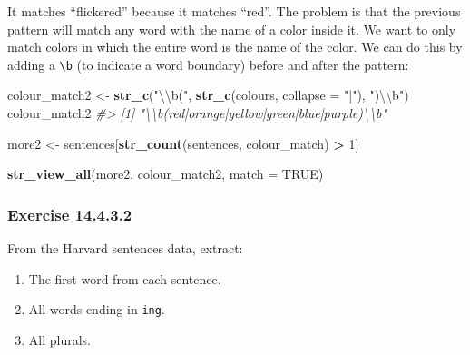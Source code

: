 \documentclass[]{book}
\newenvironment{Shaded}{\begin{snugshade}}{\end{snugshade}}
\newcommand{\CharTok}[1]{\textcolor[rgb]{0.31,0.60,0.02}{#1}}
\newcommand{\CommentTok}[1]{\textcolor[rgb]{0.56,0.35,0.01}{\textit{#1}}}
\newcommand{\DataTypeTok}[1]{\textcolor[rgb]{0.13,0.29,0.53}{#1}}
\newcommand{\DecValTok}[1]{\textcolor[rgb]{0.00,0.00,0.81}{#1}}
\newcommand{\KeywordTok}[1]{\textcolor[rgb]{0.13,0.29,0.53}{\textbf{#1}}}
\newcommand{\NormalTok}[1]{#1}
\newcommand{\OperatorTok}[1]{\textcolor[rgb]{0.81,0.36,0.00}{\textbf{#1}}}
\newcommand{\OtherTok}[1]{\textcolor[rgb]{0.56,0.35,0.01}{#1}}
\newcommand{\StringTok}[1]{\textcolor[rgb]{0.31,0.60,0.02}{#1}}
\providecommand{\tightlist}{%
  \setlength{\itemsep}{0pt}\setlength{\parskip}{0pt}}
\theoremstyle{plain}
\theoremstyle{remark}
\begin{document}
It matches ``flickered'' because it matches ``red''. The problem is that
the previous pattern will match any word with the name of a color inside
it. We want to only match colors in which the entire word is the name of
the color. We can do this by adding a \texttt{\textbackslash{}b} (to
indicate a word boundary) before and after the pattern:

\begin{Shaded}
\begin{Highlighting}[]
\NormalTok{colour_match2 <-}\StringTok{ }\KeywordTok{str_c}\NormalTok{(}\StringTok{"}\CharTok{\textbackslash{}\textbackslash{}}\StringTok{b("}\NormalTok{, }\KeywordTok{str_c}\NormalTok{(colours, }\DataTypeTok{collapse =} \StringTok{"|"}\NormalTok{), }\StringTok{")}\CharTok{\textbackslash{}\textbackslash{}}\StringTok{b"}\NormalTok{)}
\NormalTok{colour_match2}
\CommentTok{#> [1] "\textbackslash{}\textbackslash{}b(red|orange|yellow|green|blue|purple)\textbackslash{}\textbackslash{}b"}
\end{Highlighting}
\end{Shaded}

\begin{Shaded}
\begin{Highlighting}[]
\NormalTok{more2 <-}\StringTok{ }\NormalTok{sentences[}\KeywordTok{str_count}\NormalTok{(sentences, colour_match) }\OperatorTok{>}\StringTok{ }\DecValTok{1}\NormalTok{]}
\end{Highlighting}
\end{Shaded}

\begin{Shaded}
\begin{Highlighting}[]
\KeywordTok{str_view_all}\NormalTok{(more2, colour_match2, }\DataTypeTok{match =} \OtherTok{TRUE}\NormalTok{)}
\end{Highlighting}
\end{Shaded}

\hypertarget{exercise-14.4.3.2}{%
\subsubsection*{\texorpdfstring{Exercise
{14.4.3.2}}{Exercise 14.4.3.2}}\label{exercise-14.4.3.2}}

From the Harvard sentences data, extract:

\begin{enumerate}
\def\labelenumi{\arabic{enumi}.}
\tightlist
\item
  The first word from each sentence.
\item
  All words ending in \texttt{ing}.
\item
  All plurals.
\end{enumerate}
\end{document}
